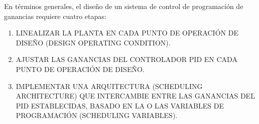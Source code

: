 \documentclass{article}
\begin{document}
\begin{sloppypar}
En términos generales, el diseño de un sistema de control de programación de ganancias requiere cuatro etapas:
\begin{enumerate}
    \item LINEALIZAR LA PLANTA EN CADA PUNTO DE OPERACIÓN DE DISEÑO (DESIGN OPERATING CONDITION).
    \item AJUSTAR LAS GANANCIAS DEL CONTROLADOR PID EN CADA PUNTO DE OPERACIÓN DE DISEÑO.
    \item IMPLEMENTAR UNA ARQUITECTURA (SCHEDULING ARCHITECTURE) QUE INTERCAMBIE ENTRE LAS GANANCIAS DEL PID ESTABLECIDAS, BASADO EN LA O LAS VARIABLES DE PROGRAMACIÓN (SCHEDULING VARIABLES).

\end{enumerate}
\end{sloppypar}
\end{document}
